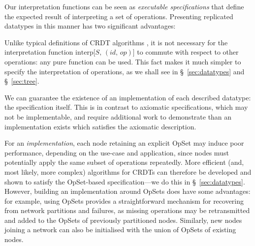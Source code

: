 Our interpretation functions can be seen as \emph{executable specifications} that define the expected result of interpreting a set of operations.
Presenting replicated datatypes in this manner has two significant advantages:
\begin{enumerate*}
\item
Unlike typical definitions of CRDT algorithms \cite{Shapiro:2011wy,Shapiro:2011un}, it is not necessary for the interpretation function $\mathrm{interp}\big[S,\, (\mathit{id},\, \mathit{op})\big]$ to commute with respect to other operations: any pure function can be used.
This fact makes it much simpler to specify the interpretation of operations, as we shall see in \S~\ref{sec:datatypes} and \S~\ref{sec:tree}.
\item
We can guarantee the existence of an implementation of each described datatype: the specification itself.
This is in contrast to axiomatic specifications, which may not be implementable, and require additional work to demonstrate than an implementation exists which satisfies the axiomatic description.
\end{enumerate*}

For an \emph{implementation}, each node retaining an explicit OpSet may induce poor performance, depending on the use-case and application, since nodes must potentially apply the same subset of operations repeatedly.
More efficient (and, most likely, more complex) algorithms for CRDTs can therefore be developed and shown to satisfy the OpSet-based specification---we do this in \S~\ref{sec:datatypes}.
However, building an implementation around OpSets does have some advantages: for example, using OpSets provides a straightforward mechanism for recovering from network partitions and failures, as missing operations may be retransmitted and added to the OpSets of previously partitioned nodes.
Similarly, new nodes joining a network can also be initialised with the union of OpSets of existing nodes.

